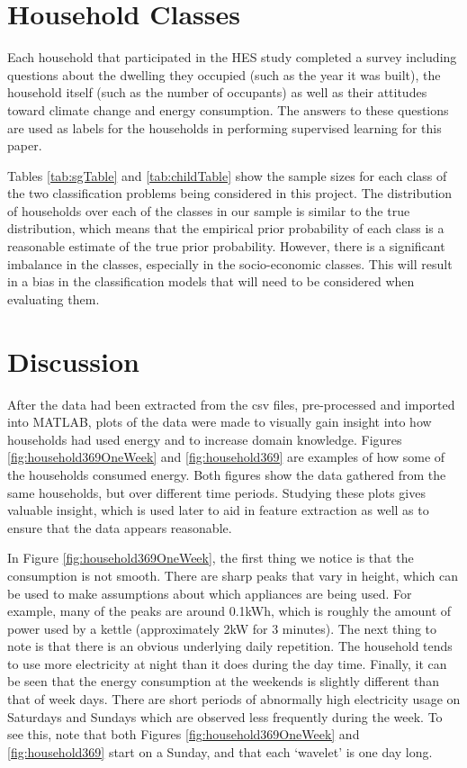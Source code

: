 \section{Household Classes}

Each household that participated in the HES study completed a survey including questions about the dwelling they occupied (such as the year it was built), the household itself (such as the number of occupants) as well as their attitudes toward climate change and energy consumption. The answers to these questions are used as labels for the households in performing supervised learning for this paper.

\sgTable

Tables \ref{tab:sgTable} and \ref{tab:childTable} show the sample sizes for each class of the two classification problems being considered in this project. The distribution of households over each of the classes in our sample is similar to the true distribution, which means that the empirical prior probability of each class is a reasonable estimate of the true prior probability. However, there is a significant imbalance in the classes, especially in the socio-economic classes. This will result in a bias in the classification models that will need to be considered when evaluating them.
\childTable

\section{Discussion}

After the data had been extracted from the csv files, pre-processed and imported into MATLAB, plots of the data were made to visually gain insight into how households had used energy and to increase domain knowledge. Figures \ref{fig:household369OneWeek} and \ref{fig:household369} are examples of how some of the households consumed energy. Both figures show the data gathered from the same households, but over different time periods. Studying these plots gives valuable insight, which is used later to aid in feature extraction as well as to ensure that the data appears reasonable. 

In Figure \ref{fig:household369OneWeek}, the first thing we notice is that the consumption is not smooth. There are sharp peaks that vary in height, which can be used to make assumptions about which appliances are being used. For example, many of the peaks are around 0.1kWh, which is roughly the amount of power used by a kettle (approximately 2kW for 3 minutes). The next thing to note is that there is an obvious underlying daily repetition. The household tends to use more electricity at night than it does during the day time. Finally, it can be seen that the energy consumption at the weekends is slightly different than that of week days. There are short periods of abnormally high electricity usage on Saturdays and Sundays which are observed less frequently during the week. To see this, note that both Figures \ref{fig:household369OneWeek} and \ref{fig:household369} start on a Sunday, and that each `wavelet' is one day long.

